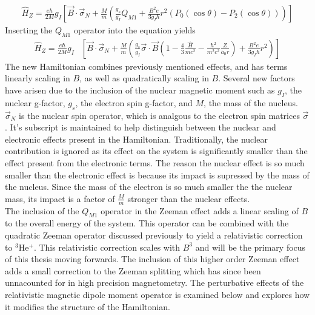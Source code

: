             \begin{align}
                \hat{H}_Z = \frac{e\hbar}{2M} g_I  \left[ \vec{B} \cdot \vec{\sigma}_N + \frac{M}{m} \left(\frac{g_s}{g_I} Q_{M1} + \frac{B^2 e}{3g_I \hbar} r^2 \left( P_0(\cos \theta) - P_2(\cos\theta) \right) \right) \right]
            \end{align}
            \noindent Inserting the $Q_{M1}$ operator into the equation yields 
            \small         
            \begin{align}
                \hat{H}_Z = \frac{e\hbar}{2M} g_I  &\left[ \vec{B} \cdot \vec{\sigma}_N + \frac{M}{m} \left(\frac{g_s}{g_I} \vec{\sigma} \cdot \vec{B} \left(1 - \frac{4}{3}\frac{\hat{H}}{mc^2} - \frac{\hbar^2}{m^2 c^2}\frac{Z}{\bar{a}_0 r} \right) + \frac{B^2 e}{3g_I \hbar} r^2 \right) \right]
            \end{align}
            \normalsize
            \noindent The new Hamiltonian combines previously mentioned effects, and has terms linearly scaling in $B$, as well as quadratically scaling in $B$. Several new factors have arisen due to the inclusion of the nuclear magnetic moment such as $g_I$, the nuclear g-factor, $g_s$, the electron spin g-factor, and $M$, the mass of the nucleus. $\vec{\sigma}_N$ is the nuclear spin operator, which is analgous to the electron spin matrices $\vec{\sigma}$. It's subscript is maintained to help distinguish between the nuclear and electronic effects present in the Hamiltonian. Traditionally, the nuclear contribution is ignored as its effect on the system is significantly smaller than the effect present from the electronic terms. The reason the nuclear effect is so much smaller than the electronic effect is because its impact is supressed by the mass of the nucleus. Since the mass of the electron is so much smaller the the nuclear mass, its impact is a factor of $\frac{M}{m}$ stronger than the nuclear effects.\\

            The inclusion of the $Q_{M1}$ operator in the Zeeman effect adds a linear scaling of $B$ to the overall energy of the system. This operator can be combined with the quadratic Zeeman operator discussed previously to yield a relativistic correction to $^3$He$^+$. This relativistic correction scales with $B^3$ and will be the primary focus of this thesis moving forwards. The inclusion of this higher order Zeeman effect adds a small correction to the Zeeman splitting which has since been unnacounted for in high precision magnetometry. The perturbative effects of the relativistic magnetic dipole moment operator is examined below and explores how it modifies the structure of the Hamiltonian. \\
            
